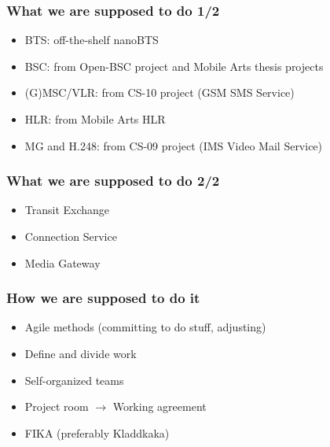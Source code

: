 \documentclass{beamer}
\begin{document}
\begin{frame}
	\frametitle{What we are supposed to do 1/2}

	\begin{itemize}

	\item
	BTS: off-the-shelf nanoBTS
	\item
  	BSC: from Open-BSC project and Mobile Arts thesis projects
   	\item
	(G)MSC/VLR: from CS-10 project (GSM SMS Service)
	\item
	HLR: from Mobile Arts HLR
	\item
	MG and H.248: from CS-09 project (IMS Video Mail Service)

	\end{itemize}

\end{frame}

\begin{frame}
	\frametitle{What we are supposed to do 2/2}

	\begin{itemize}

	\item
	Transit Exchange

	\item
	Connection Service

	\item
	Media Gateway

	\end{itemize}

\end{frame}

\begin{frame}
	\frametitle{How we are supposed to do it}

	\begin{itemize}

	\item
	Agile methods (committing to do stuff, adjusting)

	\item
	Define and divide work

	\item
	Self-organized teams

	\item
	Project room $\rightarrow$ Working agreement

	\item
	FIKA (preferably Kladdkaka)

	\end{itemize}

\end{frame}
\end{document}
